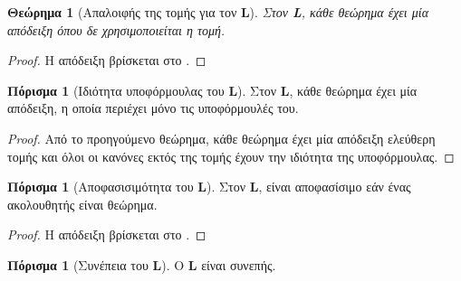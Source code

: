 \documentclass [a4paper,11pt] {book}
\newtheorem{theorema}[theorem]{Θεώρημα}
\theoremstyle{definition}
\newtheorem{corollary}[theorem]{Πόρισμα}
\theoremstyle{definition}
\begin{document}
\begin{theorema}[Απαλοιφής της τομής για τον \textbf{L}]
\label{cutEliminationTheorem}
Στον \textbf{L}, κάθε θεώρημα έχει μία απόδειξη όπου δε χρησιμοποιείται η τομή.
\end{theorema}
\begin{proof}
Η απόδειξη βρίσκεται στο \citep{lamb:math58}.
\end{proof}
\begin{corollary}[Ιδιότητα υποφόρμουλας του \textbf{L}]
\label{subFormulaProperty}
Στον \textbf{L}, κάθε θεώρημα έχει μία απόδειξη, η οποία περιέχει μόνο τις υποφόρμουλές του.
\end{corollary}
\begin{proof}
Από το προηγούμενο θεώρημα, κάθε θεώρημα έχει μία απόδειξη ελεύθερη τομής και όλοι οι κανόνες εκτός της τομής έχουν την ιδιότητα της υποφόρμουλας.
\end{proof}
\begin{corollary}[Αποφασισιμότητα του \textbf{L}]
\label{decidabilityOfL}
Στον \textbf{L}, είναι αποφασίσιμο εάν ένας ακολουθητής είναι θεώρημα.
\end{corollary}
\begin{proof}
Η απόδειξη βρίσκεται στο \citep{morrill2010categorial}.
\end{proof}
\begin{corollary}[Συνέπεια του \textbf{L}]
Ο \textbf{L} είναι συνεπής.
\end{corollary}
\end{document}
